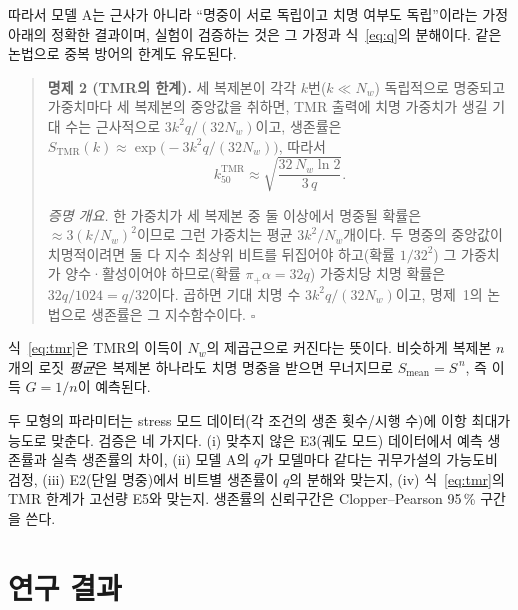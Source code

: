 \documentclass[11pt,a4paper]{article}
\begin{document}
따라서 모델 A는 근사가 아니라 ``명중이 서로 독립이고 치명 여부도 독립''이라는 가정 아래의 정확한 결과이며, 실험이 검증하는 것은 그 가정과 식~\eqref{eq:q}의 분해이다. 같은 논법으로 중복 방어의 한계도 유도된다.

\begin{quote}
\textbf{명제 2 (TMR의 한계).} 세 복제본이 각각 $k$번($k\ll N_w$) 독립적으로 명중되고 가중치마다 세 복제본의 중앙값을 취하면, TMR 출력에 치명 가중치가 생길 기대 수는 근사적으로 $3k^2 q/(32N_w)$이고, 생존률은 $S_{\mathrm{TMR}}(k)\approx\exp\!\big(-3k^2q/(32N_w)\big)$, 따라서
\begin{equation}
  k_{50}^{\mathrm{TMR}} \approx \sqrt{\frac{32\,N_w\ln2}{3\,q}} .
  \label{eq:tmr}
\end{equation}

\emph{증명 개요.} 한 가중치가 세 복제본 중 둘 이상에서 명중될 확률은 $\approx3(k/N_w)^2$이므로 그런 가중치는 평균 $3k^2/N_w$개이다. 두 명중의 중앙값이 치명적이려면 둘 다 지수 최상위 비트를 뒤집어야 하고(확률 $1/32^2$) 그 가중치가 양수·활성이어야 하므로(확률 $\pi_+\alpha=32q$) 가중치당 치명 확률은 $32q/1024=q/32$이다. 곱하면 기대 치명 수 $3k^2q/(32N_w)$이고, 명제~1의 논법으로 생존률은 그 지수함수이다. $\square$
\end{quote}

식~\eqref{eq:tmr}은 TMR의 이득이 $N_w$의 제곱근으로 커진다는 뜻이다. 비슷하게 복제본 $n$개의 로짓 \emph{평균}은 복제본 하나라도 치명 명중을 받으면 무너지므로 $S_{\mathrm{mean}}=S^{\,n}$, 즉 이득 $G=1/n$이 예측된다.

두 모형의 파라미터는 stress 모드 데이터(각 조건의 생존 횟수/시행 수)에 이항 최대가능도로 맞춘다. 검증은 네 가지다. (i) 맞추지 않은 E3(궤도 모드) 데이터에서 예측 생존률과 실측 생존률의 차이, (ii) 모델 A의 $q$가 모델마다 같다는 귀무가설의 가능도비 검정, (iii) E2(단일 명중)에서 비트별 생존률이 $q$의 분해와 맞는지, (iv) 식~\eqref{eq:tmr}의 TMR 한계가 고선량 E5와 맞는지. 생존률의 신뢰구간은 Clopper--Pearson 95\,\% 구간을 쓴다.

\section{연구 결과}
\end{document}
